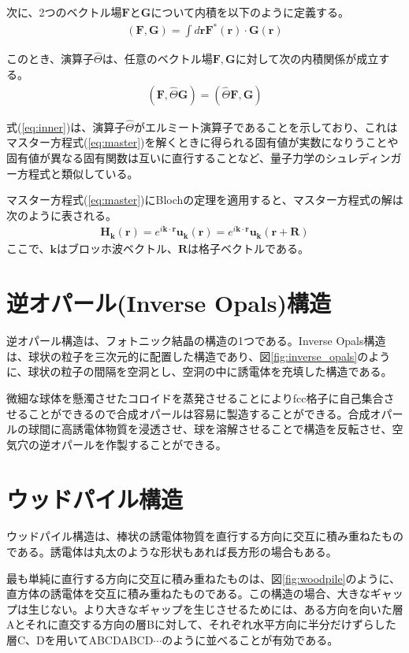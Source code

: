 \documentclass[platex,dvipdfmx,draft]{jsreport}
\numberwithin{equation}{section}
\begin{document}
次に、2つのベクトル場$\bm{F}$と$\bm{G}$について内積を以下のように定義する。
\begin{align}
  (\bm{F}, \bm{G}) = \int d\bm{r} \bm{F}^*(\bm{r}) \cdot \bm{G}(\bm{r})
\end{align}

このとき、演算子$\hat{\Theta}$は、任意のベクトル場$\bm{F}, \bm{G}$に対して次の内積関係が成立する。
\begin{align}
  \label{eq:inner}
  (\bm{F}, \hat{\Theta} \bm{G}) = (\hat{\Theta} \bm{F}, \bm{G})
\end{align}

式(\ref{eq:inner})は、演算子$\hat{\Theta}$がエルミート演算子であることを示しており、これはマスター方程式(\ref{eq:master})を解くときに得られる固有値が実数になりうことや固有値が異なる固有関数は互いに直行することなど、量子力学のシュレディンガー方程式と類似している。

マスター方程式(\ref{eq:master})にBlochの定理を適用すると、マスター方程式の解は次のように表される。
\begin{align}
  \bm{H}_{\bm{k}}(\bm{r}) = e^{i \bm{k} \cdot \bm{r}} \bm{u}_{\bm{k}}(\bm{r}) = e^{i \bm{k} \cdot \bm{r}} \bm{u}_{\bm{k}}(\bm{r + R})
\end{align}
ここで、$\bm{k}$はブロッホ波ベクトル、$\bm{R}$は格子ベクトルである。

\section{逆オパール(Inverse Opals)構造}
逆オパール構造は、フォトニック結晶の構造の1つである。Inverse Opals構造は、球状の粒子を三次元的に配置した構造であり、図\ref{fig:inverse_opals}のように、球状の粒子の間隔を空洞とし、空洞の中に誘電体を充填した構造である。

微細な球体を懸濁させたコロイドを蒸発させることによりfcc格子に自己集合させることができるので合成オパールは容易に製造することができる。合成オパールの球間に高誘電体物質を浸透させ、球を溶解させることで構造を反転させ、空気穴の逆オパールを作製することができる。

\section{ウッドパイル構造}
ウッドパイル構造は、棒状の誘電体物質を直行する方向に交互に積み重ねたものである。誘電体は丸太のような形状もあれば長方形の場合もある。

最も単純に直行する方向に交互に積み重ねたものは、図\ref{fig:woodpile}のように、直方体の誘電体を交互に積み重ねたものである。この構造の場合、大きなギャップは生じない。より大きなギャップを生じさせるためには、ある方向を向いた層Aとそれに直交する方向の層Bに対して、それぞれ水平方向に半分だけずらした層C、Dを用いてABCDABCD$\cdots$のように並べることが有効である。
\end{document}

